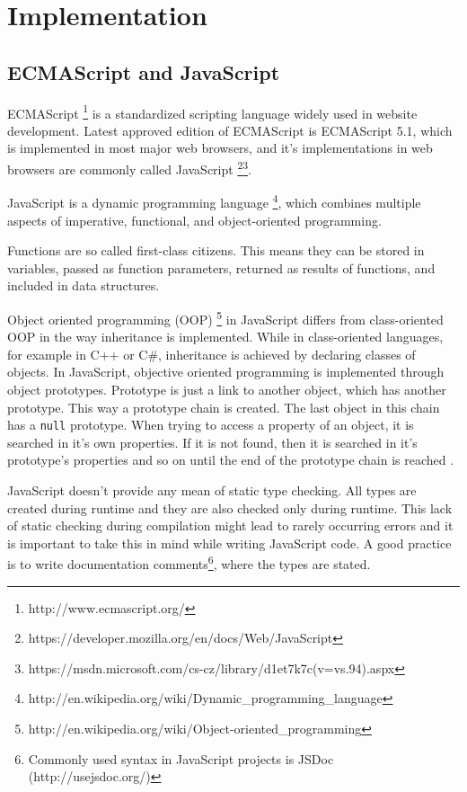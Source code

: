\chapter{Implementation}





\section{ECMAScript and JavaScript}
ECMAScript \footnote{http://www.ecmascript.org/} is a standardized scripting language widely used in website development. Latest approved edition of ECMAScript is ECMAScript 5.1, which is implemented in most major web browsers, and it's implementations in web browsers are commonly called JavaScript \footnote{https://developer.mozilla.org/en/docs/Web/JavaScript}\footnote{https://msdn.microsoft.com/cs-cz/library/d1et7k7c(v=vs.94).aspx}. 

JavaScript is a dynamic programming language \footnote{http://en.wikipedia.org/wiki/Dynamic\_programming\_language}, which combines multiple aspects of imperative, functional, and object-oriented programming.

Functions are so called first-class citizens. This means they can be stored in variables, passed as function parameters, returned as results of functions, and included in data structures.

Object oriented programming (OOP) \footnote{http://en.wikipedia.org/wiki/Object-oriented\_programming} in JavaScript differs from class-oriented OOP in the way inheritance is implemented. While in class-oriented languages, for example in C++ or C\#, inheritance is achieved by declaring classes of objects. In JavaScript, objective oriented programming is implemented through object prototypes. Prototype is just a link to another object, which has another prototype. This way a prototype chain is created. The last object in this chain has a \verb|null| prototype. When trying to access a property of an object, it is searched in it's own properties. If it is not found, then it is searched in it's prototype's properties and so on until the end of the prototype chain is reached \cite{mdn_prototype_chain}.

JavaScript doesn't provide any mean of static type checking. All types are created during runtime and they are also checked only during runtime. This lack of static checking during compilation might lead to rarely occurring errors and it is important to take this in mind while writing JavaScript code. A good practice is to write documentation comments\footnote{Commonly used syntax in JavaScript projects is JSDoc (http://usejsdoc.org/)}, where the types are stated.

